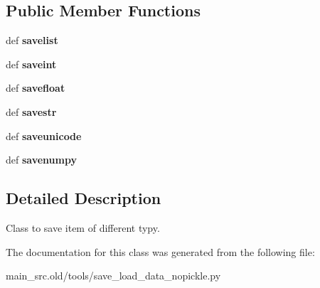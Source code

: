\subsection*{Public Member Functions}
\begin{DoxyCompactItemize}
\item 
\hypertarget{classmain__src_8old_1_1tools_1_1save__load__data__nopickle_1_1SaveItems_acee3033666a636e643a063c2cb5c755b}{def {\bfseries savelist}}\label{classmain__src_8old_1_1tools_1_1save__load__data__nopickle_1_1SaveItems_acee3033666a636e643a063c2cb5c755b}

\item 
\hypertarget{classmain__src_8old_1_1tools_1_1save__load__data__nopickle_1_1SaveItems_ab2531ba1fe17001031bf4c4051bb71fe}{def {\bfseries saveint}}\label{classmain__src_8old_1_1tools_1_1save__load__data__nopickle_1_1SaveItems_ab2531ba1fe17001031bf4c4051bb71fe}

\item 
\hypertarget{classmain__src_8old_1_1tools_1_1save__load__data__nopickle_1_1SaveItems_aed4ec620fbe0f834aaa3894644d89b36}{def {\bfseries savefloat}}\label{classmain__src_8old_1_1tools_1_1save__load__data__nopickle_1_1SaveItems_aed4ec620fbe0f834aaa3894644d89b36}

\item 
\hypertarget{classmain__src_8old_1_1tools_1_1save__load__data__nopickle_1_1SaveItems_a0a081327ced43969b09e4e38d77fd4a4}{def {\bfseries savestr}}\label{classmain__src_8old_1_1tools_1_1save__load__data__nopickle_1_1SaveItems_a0a081327ced43969b09e4e38d77fd4a4}

\item 
\hypertarget{classmain__src_8old_1_1tools_1_1save__load__data__nopickle_1_1SaveItems_aff89c7c0fef6421d9079449937168876}{def {\bfseries saveunicode}}\label{classmain__src_8old_1_1tools_1_1save__load__data__nopickle_1_1SaveItems_aff89c7c0fef6421d9079449937168876}

\item 
\hypertarget{classmain__src_8old_1_1tools_1_1save__load__data__nopickle_1_1SaveItems_ac182c1eab14b52096741a99f1b5d5002}{def {\bfseries savenumpy}}\label{classmain__src_8old_1_1tools_1_1save__load__data__nopickle_1_1SaveItems_ac182c1eab14b52096741a99f1b5d5002}

\end{DoxyCompactItemize}


\subsection{Detailed Description}
Class to save item of different typy. 

The documentation for this class was generated from the following file\-:\begin{DoxyCompactItemize}
\item 
main\-\_\-src.\-old/tools/save\-\_\-load\-\_\-data\-\_\-nopickle.\-py\end{DoxyCompactItemize}
